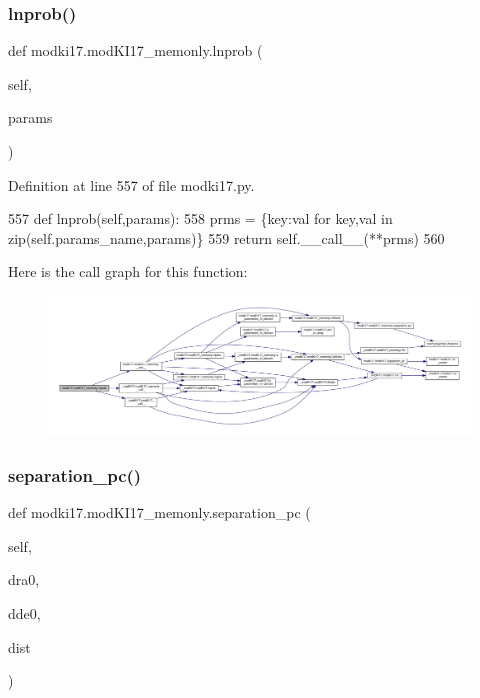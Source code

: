 \subsubsection{\texorpdfstring{lnprob()}{lnprob()}}
{\footnotesize\ttfamily def modki17.\+mod\+K\+I17\+\_\+memonly.\+lnprob (\begin{DoxyParamCaption}\item[{}]{self,  }\item[{}]{params }\end{DoxyParamCaption})}



Definition at line 557 of file modki17.\+py.


\begin{DoxyCode}
557     \textcolor{keyword}{def }lnprob(self,params):
558         prms = \{key:val \textcolor{keywordflow}{for} key,val \textcolor{keywordflow}{in} zip(self.params\_name,params)\}
559         \textcolor{keywordflow}{return} self.\_\_call\_\_(**prms)
560     
\end{DoxyCode}
Here is the call graph for this function\+:\nopagebreak
\begin{figure}[H]
\begin{center}
\leavevmode
\includegraphics[width=350pt]{df/da2/classmodki17_1_1modKI17__memonly_a5eb9873dae68be85438e7014425d69a0_cgraph}
\end{center}
\end{figure}
\mbox{\label{classmodki17_1_1modKI17__memonly_ae46bea8dc18dc3d68cd1fe560da8eee8}} 
\subsubsection{\texorpdfstring{separation\+\_\+pc()}{separation\_pc()}}
{\footnotesize\ttfamily def modki17.\+mod\+K\+I17\+\_\+memonly.\+separation\+\_\+pc (\begin{DoxyParamCaption}\item[{}]{self,  }\item[{}]{dra0,  }\item[{}]{dde0,  }\item[{}]{dist }\end{DoxyParamCaption})}



